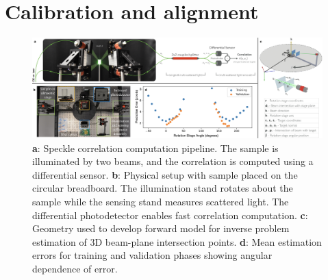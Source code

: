
\section{Calibration and alignment}
\begin{figure}
    \centering
    \includegraphics[width=\textwidth]{figures/experiment.png}
    \caption{\textbf{a}: Speckle correlation computation pipeline. The sample is illuminated by two beams, and the correlation is computed using a differential sensor. \textbf{b}: Physical setup with sample placed on the circular breadboard. The illumination stand rotates about the sample while the sensing stand measures scattered light. The differential photodetector enables fast correlation computation. \textbf{c}: Geometry used to develop forward model for inverse problem estimation of 3D beam-plane intersection points. \textbf{d}: Mean estimation errors for training and validation phases showing angular dependence of error.}
    \label{fig:3}
\end{figure}


